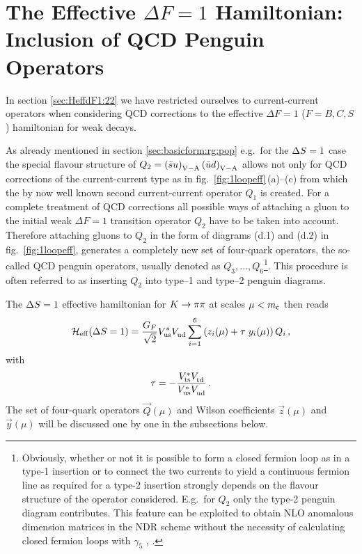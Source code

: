\section{The Effective $\Delta F=1$ Hamiltonian: Inclusion of QCD Penguin
         Operators}
         \label{sec:HeffdF1:66}
In section \ref{sec:HeffdF1:22} we have restricted ourselves 
to current-current operators when considering
QCD corrections to the effective $\Delta F=1$ ($F=B, C, S$)
hamiltonian for weak decays.

As already mentioned in section \ref{sec:basicform:rg:pop} e.g.\ for
the $\Delta S=1$ case the special flavour structure of $Q_{2} = \left( \bar s
u \right)_{\rm V-A} \left( \bar u d \right)_{\rm V-A}$ allows not only
for QCD corrections of the current-current type as in
fig.\ \ref{fig:1loopeff}\,(a)--(c) from which the by now well known
second current-current operator $Q_1$ is created.  For a complete
treatment of QCD corrections all possible ways of attaching a gluon to
the initial weak $\Delta F=1$ transition operator $Q_2$ have to be
taken into account. Therefore attaching gluons to $Q_2$ in the form of
diagrams (d.1) and (d.2) in fig.\ \ref{fig:1loopeff}, generates a
completely new set of four-quark operators, the so-called QCD penguin
operators, usually denoted as $Q_3, \ldots, Q_6$\footnote{Obviously,
whether or not it is possible to form a closed fermion loop as in a
type-1 insertion or to connect the two currents to yield a continuous
fermion line as required for a type-2 insertion strongly depends on the
flavour structure of the operator considered. E.g.\ for $Q_2$ only the
type-2 penguin diagram contributes. This feature can be exploited
to obtain NLO anomalous dimension matrices in the NDR scheme 
without the necessity of calculating closed fermion loops with $\gamma_5$
\cite{burasetal:92b}, \cite{burasetal:92c}.}. This procedure is often
referred to as inserting $Q_2$ into type--1 and type--2 penguin
diagrams.


The $\Delta S=1$ effective hamiltonian for $K \to \pi\pi$ at scales $\mu < m_{\rm c}$ then
reads
\begin{equation}
{\cal H}_{\rm eff}(\Delta S=1) = \frac{G_F}{\sqrt{2}} V_{\rm us}^* V_{\rm ud}^{} \sum_{i=1}^{6}
\left( z_i(\mu) + \tau \; y_i(\mu) \right) Q_i \, ,
\label{eq:HeffKpp}
\end{equation}
with
\begin{equation}
\tau = -\frac{V_{\rm ts}^*V_{\rm td}^{}}{V_{\rm us}^*V_{\rm ud}^{}} \, .
\label{eq:tauKpp}
\end{equation}
The set of four-quark operators $\vec{Q}(\mu)$ and Wilson coefficients
$\vec{z}(\mu)$ and $\vec{y}(\mu)$ will be discussed one by one in
the subsections below.

